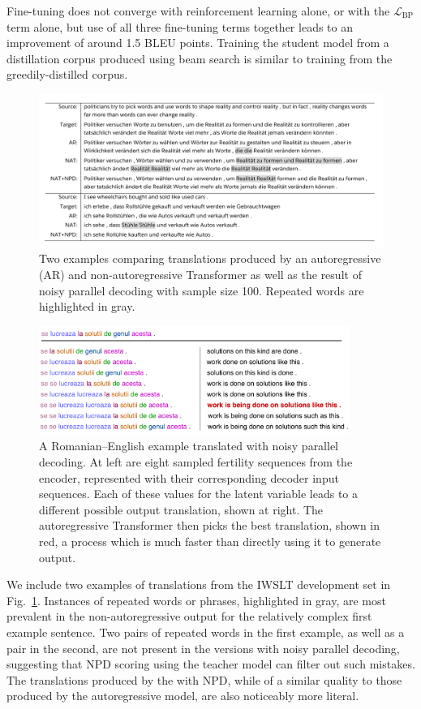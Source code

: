 Fine-tuning does not converge with reinforcement learning alone, or with the $\mathcal{L}_\text{BP}$ term alone, but use of all three fine-tuning terms together leads to an improvement of around 1.5 BLEU points. Training the student model from a distillation corpus produced using beam search is similar to training from the greedily-distilled corpus.

\begin{figure}[htpb]
\includegraphics[width=\textwidth]{figs/nat/examples1}
\caption{\label{fig.ex} Two examples comparing translations produced by an autoregressive (AR) and non-autoregressive Transformer as well as the result of noisy parallel decoding with sample size 100. Repeated words are highlighted in gray.}
\end{figure}
\begin{figure}[htpb]
\centering
\includegraphics[width=0.9\textwidth]{figs/nat/fertility_example2}
\caption{\label{fig.fer} A Romanian--English example translated with noisy parallel decoding. At left are eight sampled fertility sequences from the encoder, represented with their corresponding decoder input sequences. Each of these values for the latent variable leads to a different possible output translation, shown at right. The autoregressive Transformer then picks the best translation, shown in red, a process which is much faster than directly using it to generate output.}
\end{figure}

We include two examples of translations from the IWSLT development set in Fig.~\ref{fig.ex}.
Instances of repeated words or phrases, highlighted in gray, are most prevalent in the non-autoregressive output for the relatively complex first example sentence. Two pairs of repeated words in the first example, as well as a pair in the second, are not present in the versions with noisy parallel decoding, suggesting that NPD scoring using the teacher model can filter out such mistakes. The translations produced by the \model{} with NPD, while of a similar quality to those produced by the autoregressive model, are also noticeably more literal. 

